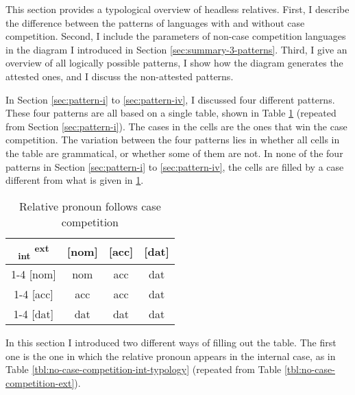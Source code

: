 This section provides a typological overview of headless relatives. First, I describe the difference between the patterns of languages with and without case competition. Second, I include the parameters of non-case competition languages in the diagram I introduced in Section \ref{sec:summary-3-patterns}. Third, I give an overview of all logically possible patterns, I show how the diagram generates the attested ones, and I discuss the non-attested patterns.

In Section \ref{sec:pattern-i} to \ref{sec:pattern-iv}, I discussed four different patterns. These four patterns are all based on a single table, shown in Table \ref{tbl:case-competition-int-ext-typology} (repeated from Section \ref{sec:pattern-i}). The cases in the cells are the ones that win the case competition.
The variation between the four patterns lies in whether all cells in the table are grammatical, or whether some of them are not. In none of the four patterns in Section \ref{sec:pattern-i} to \ref{sec:pattern-iv}, the cells are filled by a case different from what is given in \ref{tbl:case-competition-int-ext-typology}.

\begin{table}[ht]
  \center
  \caption{Relative pronoun follows case competition}
  \begin{tabular}{c|c|c|c}
    \toprule
    \textsubscript{\ac{int}} \textsuperscript{\ac{ext}}
           & [\ac{nom}]
           & [\ac{acc}]
           & [\ac{dat}]
           \\ \cmidrule{1-4}
       [\ac{nom}]
           & \ac{nom}
           & \ac{acc}
           & \ac{dat}
           \\ \cmidrule{1-4}
       [\ac{acc}]
           & \ac{acc}
           & \ac{acc}
           & \ac{dat}
           \\ \cmidrule{1-4}
       [\ac{dat}]
           & \ac{dat}
           & \ac{dat}
           & \ac{dat}
           \\
     \bottomrule
  \end{tabular}
    \label{tbl:case-competition-int-ext-typology}
\end{table}

In this section I introduced two different ways of filling out the table. The first one is the one in which the relative pronoun appears in the internal case, as in Table \ref{tbl:no-case-competition-int-typology} (repeated from Table \ref{tbl:no-case-competition-ext}).

